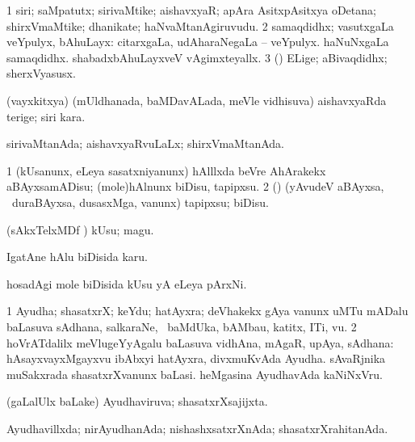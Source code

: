 {\bentry
{} 
\gl{\nA}
\expl{}
\bmng
\bnum
\num{1} siri; saMpatutx; sirivaMtike; aishavxyaR; apAra AsitxpAsitxya oDetana; shirxVmaMtike; dhanikate; haNvaMtanAgiruvudu. 
\num{2} samaqdidhx; vasutxgaLa veYpulyx, bAhuLayx:  citarxgaLa, udAharaNegaLa -- veYpulyx.  haNuNxgaLa samaqdidhx.  shabadxbAhuLayxveV vAgimxteyallx. 
\num{3} (\pArxparx) ELige; aBivaqdidhx; sherxVyasusx. 
\enum
\emng
\eentry

\bentry
{} 
\gl{\nA}
\expl{}
\bmng
(vayxkitxya) (mUldhanada, baMDavALada, meVle vidhisuva) aishavxyaRda terige; siri kara. 
\emng
\eentry

\bentry
{} 
\gl{\gu}
\bmng
sirivaMtanAda; aishavxyaRvuLaLx; shirxVmaMtanAda. 
\emng
\eentry

\bentry
{} 
\gl{\sakirx}
\expl{}
\bmng
\bnum
\num{1} (kUsanunx, eLeya sasatxniyanunx) hAlllxda beVre AhArakekx aBAyxsamADisu; (mole)hAlnunx biDisu, tapipxsu. 
\num{2} (\rUpa) (yAvudeV aBAyxsa, \kanmu\ duraBAyxsa, dusasxMga, \mo vanunx) tapipxsu; biDisu. 
\enum
\emng
\eentry

\bentry
{} 
\gl{\nA}
\expl{}
\bmng
(sAkxTelxMDf \parx) kUsu; magu. 
\emng
\eentry

\bentry
{} 
\gl{\nA}
\expl{}
\bmng
IgatAne hAlu biDisida karu. 
\emng
\eentry

\bentry
{} 
\gl{\nA}
\expl{}
\bmng
hosadAgi mole biDisida kUsu yA eLeya pArxNi. 
\emng
\eentry

\bentry
{} 
\gl{\nA}
\expl{}
\bmng
\bnum
\num{1} Ayudha; shasatxrX; keYdu; hatAyxra; deVhakekx gAya \mo vanunx uMTu mADalu baLasuva sAdhana, salkaraNe, \udA\ baMdUka, bAMbau, katitx, ITi, \mo vu. 
\num{2} hoVrATdalilx meVlugeYyAgalu baLasuva vidhAna, mAgaR, upAya, sAdhana:  hAsayxvayxMgayxvu ibAbxyi hatAyxra, divxmuKvAda Ayudha.  sAvaRjnika muSakxrada shasatxrXvanunx baLasi.  heMgasina AyudhavAda kaNiNxVru. 
\enum
\emng
\eentry

\bentry
{} 
\gl{\gu}
\expl{}
\bmng
(\saMpa gaLalUlx baLake) Ayudhaviruva; shasatxrXsajijxta. 
\emng
\eentry

\bentry
{} 
\gl{\gu}
\expl{}
\bmng
Ayudhavillxda; nirAyudhanAda; nishashxsatxrXnAda; shasatxrXrahitanAda. 
\emng
\eentry

}
